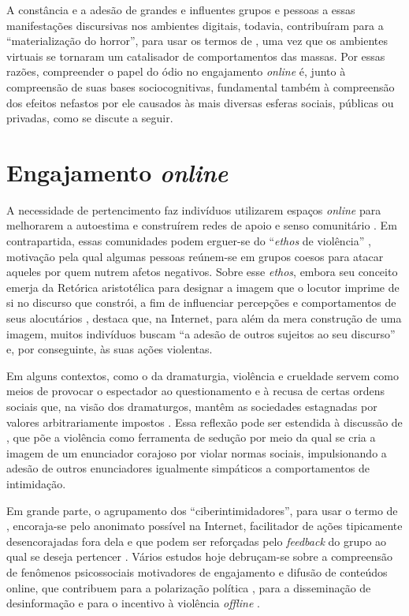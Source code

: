 \documentclass[portuguese]{textolivre}
\begin{document}
A constância e a adesão de grandes e influentes grupos e pessoas a essas manifestações discursivas nos ambientes digitais, todavia, contribuíram para a “materialização do horror”, para usar os termos de \textcite[p.10]{cattani2020}, uma vez que os ambientes virtuais se tornaram um catalisador de comportamentos das massas. Por essas razões, compreender o papel do ódio no engajamento \emph{online} é, junto à compreensão de suas bases sociocognitivas, fundamental também à compreensão dos efeitos nefastos por ele causados às mais diversas esferas sociais, públicas ou privadas, como se discute a seguir.

\section{Engajamento \emph{online}}

A necessidade de pertencimento faz indivíduos utilizarem espaços \textit{online} para melhorarem a autoestima \cite{santoso2018} e construírem redes de apoio e senso comunitário \cite{garg2023handling}. Em contrapartida, essas comunidades podem erguer-se do “\textit{ethos} de violência” \cite{silvada2018ethos}, motivação pela qual algumas pessoas reúnem-se em grupos coesos para atacar aqueles por quem nutrem afetos negativos. Sobre esse \textit{ethos}, embora seu conceito emerja da Retórica aristotélica para designar a imagem que o locutor imprime de si no discurso que constrói, a fim de influenciar percepções e comportamentos de seus alocutários \cite{amossycharaudeua2008}, \textcite[p. 71]{silvada2018ethos} destaca que, na Internet, para além da mera construção de uma imagem, muitos indivíduos buscam “a adesão de outros sujeitos ao seu discurso” e, por conseguinte, às suas ações violentas.

Em alguns contextos, como o da dramaturgia, violência e crueldade servem como meios de provocar o espectador ao questionamento e à recusa de certas ordens sociais que, na visão dos dramaturgos, mantêm as sociedades estagnadas por valores arbitrariamente impostos \cite{glucksmann2007}. Essa reflexão pode ser estendida à discussão de \textcite{silvada2018ethos}, que põe a violência como ferramenta de sedução por meio da qual se cria a imagem de um enunciador corajoso por violar normas sociais, impulsionando a adesão de outros enunciadores igualmente simpáticos a comportamentos de intimidação.

Em grande parte, o agrupamento dos “ciberintimidadores”, para usar o termo de \textcite[p.71]{silvada2018ethos}, encoraja-se pelo anonimato possível na Internet, facilitador de ações tipicamente desencorajadas fora dela \cite{suler2004online} e que podem ser reforçadas pelo \emph{feedback} do grupo ao qual se deseja pertencer \cite{brady2021social}. Vários estudos hoje debruçam-se sobre a compreensão de fenômenos psicossociais motivadores de engajamento e difusão de conteúdos online, que contribuem para a polarização política \cite{amira2021group}, para a disseminação de desinformação \cite{pennycook2021shifting} e para o incentivo à violência \emph{offline} \cite{mooijman2018moralization}.
\end{document}
